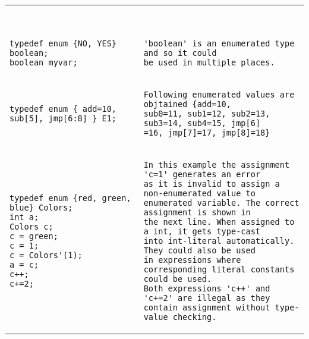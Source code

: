 \begin{table}
\begin{tabular}{p{} p{}}
\begin{Verbatim}
\end{Verbatim}
&
\begin{tbldesc}
\begin{verbatim}

\end{verbatim}
\end{tbldesc}
\\
\begin{Verbatim}
typedef enum {NO, YES} boolean;
boolean myvar;
\end{Verbatim}
&
\begin{tbldesc}
\begin{verbatim}
'boolean' is an enumerated type and so it could
be used in multiple places.
\end{verbatim}
\end{tbldesc}
\\
\begin{Verbatim}
typedef enum { add=10, sub[5], jmp[6:8] } E1;
\end{Verbatim}
&
\begin{tbldesc}
\begin{verbatim}
Following enumerated values are objtained {add=10,
sub0=11, sub1=12, sub2=13, sub3=14, sub4=15, jmp[6]
=16, jmp[7]=17, jmp[8]=18}
\end{verbatim}
\end{tbldesc}
\\
\begin{Verbatim}
typedef enum {red, green, blue} Colors;
int a;
Colors c;
c = green;
c = 1;
c = Colors'(1);
a = c;
c++;
c+=2;
\end{Verbatim}
&
\begin{tbldesc}
\begin{verbatim}
In this example the assignment 'c=1' generates an error
as it is invalid to assign a non-enumerated value to
enumerated variable. The correct assignment is shown in
the next line. When assigned to a int, it gets type-cast
into int-literal automatically. They could also be used
in expressions where corresponding literal constants
could be used.
Both expressions 'c++' and 'c+=2' are illegal as they
contain assignment without type-value checking.
\end{verbatim}
\end{tbldesc}


\end{tabular}
\end{table}
